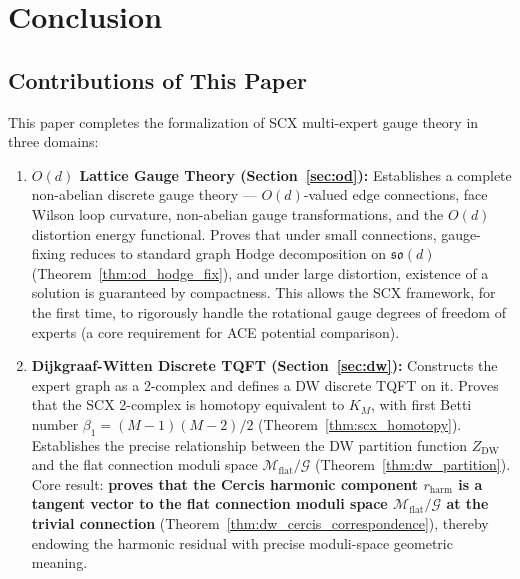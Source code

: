 \documentclass[12pt,a4paper]{article}
\theoremstyle{definition}
\theoremstyle{remark}
\theoremstyle{definition}
\newcommand{\DW}{\mathrm{DW}}
\newcommand{\ZBetti}{\beta_1}
\newcommand{\Gflatquot}{\mathcal{M}_{\mathrm{flat}}/\mathcal{G}}
\begin{document}
\newpage

\section{Conclusion}
\label{sec:conclusion}

\subsection{Contributions of This Paper}

This paper completes the formalization of SCX multi-expert gauge theory in three domains:

\begin{enumerate}[label=(\arabic*)]
    \item \textbf{$O(d)$ Lattice Gauge Theory (Section~\ref{sec:od}):}
    Establishes a complete non-abelian discrete gauge theory — $O(d)$-valued edge connections, face Wilson loop curvature,
    non-abelian gauge transformations, and the $O(d)$ distortion energy functional.
    Proves that under small connections, gauge-fixing reduces to standard graph Hodge decomposition on $\mathfrak{so}(d)$ (Theorem~\ref{thm:od_hodge_fix}),
    and under large distortion, existence of a solution is guaranteed by compactness.
    This allows the SCX framework, for the first time, to rigorously handle the rotational gauge degrees of freedom of experts (a core requirement for ACE potential comparison).

    \item \textbf{Dijkgraaf-Witten Discrete TQFT (Section~\ref{sec:dw}):}
    Constructs the expert graph as a 2-complex and defines a DW discrete TQFT on it.
    Proves that the SCX 2-complex is homotopy equivalent to $K_M$, with first Betti number $\ZBetti = (M-1)(M-2)/2$ (Theorem~\ref{thm:scx_homotopy}).
    Establishes the precise relationship between the DW partition function $Z_{\DW}$ and the flat connection moduli space $\Gflatquot$ (Theorem~\ref{thm:dw_partition}).
    Core result: \textbf{proves that the Cercis harmonic component $r_{\text{harm}}$ is a tangent vector to the flat connection moduli space $\Gflatquot$ at the trivial connection}
    (Theorem~\ref{thm:dw_cercis_correspondence}), thereby endowing the harmonic residual with precise moduli-space geometric meaning.


\end{enumerate}
\end{document}
